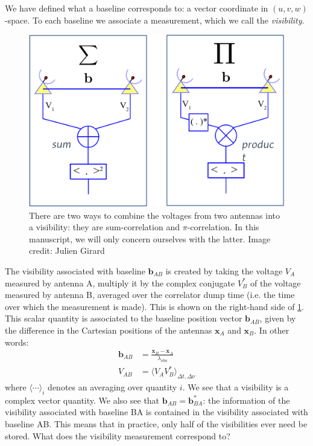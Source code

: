 \pg
We have defined what a baseline corresponds to: a vector coordinate in $(u,v,w)$-space. To each baseline we associate a measurement, which we call the \emph{visibility}. 
\begin{figure}[ht]
\centering
\includegraphics[width=.7\textwidth]{images/visibility-creation.png}
\caption{\label{fig.visibility} There are two ways to combine the voltages from two antennas into a visibility: they are sum-correlation and $\pi$-correlation. In this manuscript, we will only concern ourselves with the latter. Image credit: Julien Girard}
\end{figure}
The visibility associated with baseline $\mathbf{b}_{AB}$ is created by taking the voltage $V_A$ measured by antenna A, multiply it by the complex conjugate $V_B^*$ of the voltage measured by antenna B, averaged over the correlator dump time (i.e. the time over which the measurement is made). This is shown on the right-hand side of \cref{fig.visibility}. This scalar quantity is associated to the baseline position vector $\mathbf{b}_{AB}$, given by the difference in the Cartesian positions of the antennas $\mathbf{x}_{A}$ and $\mathbf{x}_{B}$. In other words:
\begin{align}
\mathbf{b}_{AB} &= \frac{\mathbf{x}_{B}-\mathbf{x}_{A}}{\lambda_\mathrm{obs}}\\
V_{AB}          &= \langle V_{A} V_{B}^*\rangle_{\Delta t, \Delta \nu} 
\end{align}
where $\langle \cdots \rangle_{i}$ denotes an averaging over quantity $i$. We see that a visibility is a complex vector quantity. We also see that $\mathbf{b}_{AB} = \mathbf{b}_{BA}^*$: the information of the visibility associated with baseline BA is contained in the visibility associated with baseline AB. This means that in practice, only half of the visibilities ever need be stored. What does the visibility measurement correspond to?
